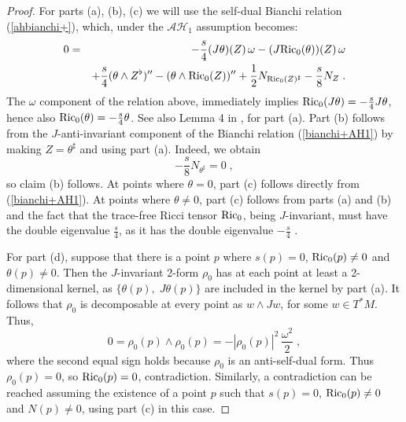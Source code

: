 \documentclass{amsart}
\begin{document}
\begin{proof}
For parts (a), (b), (c) we will use the self-dual Bianchi relation (\ref{ahbianchi+}), which, under the $\mathcal{AH}_1$ assumption becomes:
\begin{eqnarray} \label{bianchi+AH1}
 0 &=&  - \frac{s}{4} (J\theta)(Z) \, \omega - (J{\rm Ric}_0 (\theta))(Z) \, \omega \\ \nonumber
& & +\frac{s}{4} (\theta \wedge Z^{\flat} )'' - (\theta \wedge {\rm Ric}_0(Z))'' + \frac{1}{2} N_{{\rm Ric}_0 (Z)^\sharp} - \frac{s}{8} N_Z   \; .
\end{eqnarray}
The $\omega$ component of the relation above, immediately implies
${\rm Ric}_0 (J\theta) = - \frac{s}{4} J\theta$, hence also 
${\rm Ric}_0 (\theta) = - \frac{s}{4} \theta $. See also Lemma 4 in \cite{AD-QJM}, for part (a). Part (b) follows from the $J$-anti-invariant component of the Bianchi relation (\ref{bianchi+AH1}) by making $Z = \theta^{\sharp}$ and using part (a). Indeed, we obtain 
$$ - \frac{s}{8} N_{\theta^{\sharp}} = 0 \; ,$$ so claim (b) follows. At points where $\theta = 0$, part (c) follows directly from (\ref{bianchi+AH1}). At points where $\theta \neq 0$, part (c) follows from parts (a) and (b) and the fact that the trace-free Ricci tensor ${\rm Ric}_0$, being $J$-invariant, must have the double eigenvalue $\frac{s}{4}$, as it has the double eigenvalue $-\frac{s}{4}$ .

For part (d), suppose that there is a point $p$ where $s(p) = 0$, ${\rm Ric}_0(p) \neq 0 $ and $\theta(p) \neq 0$. Then the $J$-invariant 2-form $\rho_0$ has at each point at least a 2-dimensional kernel, as $\{ \theta(p), \; J\theta(p) \}$ are included in the kernel by part (a).
It follows that $\rho_0$ is decomposable at every point as $w \wedge Jw$, for some $w \in T^*M$. Thus, 
$$ 0 = \rho_0(p) \wedge \rho_0(p) = - |\rho_0 (p) |^2 \, \frac{\omega^2}{2} \; ,$$
where the second equal sign holds because $\rho_0$ is an anti-self-dual form. Thus $\rho_0 (p) = 0$, so ${\rm Ric}_0(p) = 0$, contradiction.
Similarly, a contradiction can be reached assuming the existence of a point $p$ such that $s(p) = 0$, ${\rm Ric}_0(p) \neq 0 $ and $N(p) \neq 0$, using part (c) in this case.


\end{proof}
\end{document}
